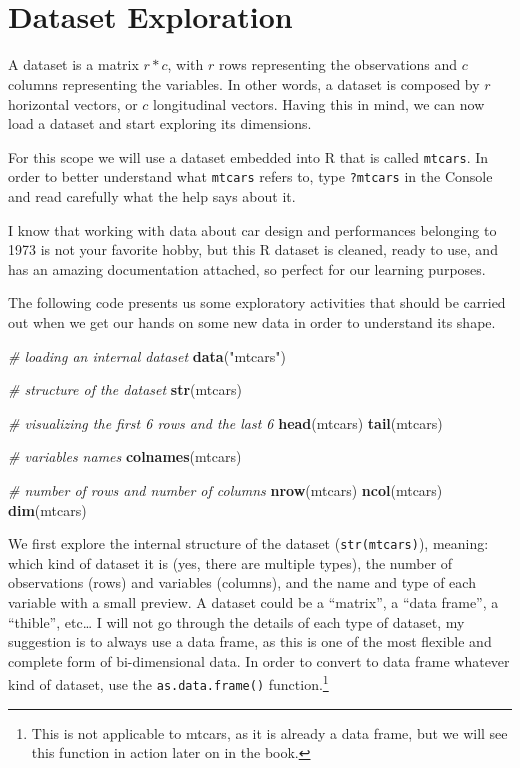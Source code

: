 \documentclass[
]{svmono}
\newenvironment{Shaded}{\begin{snugshade}}{\end{snugshade}}
\newcommand{\CommentTok}[1]{\textcolor[rgb]{0.56,0.35,0.01}{\textit{#1}}}
\newcommand{\FunctionTok}[1]{\textcolor[rgb]{0.13,0.29,0.53}{\textbf{#1}}}
\newcommand{\NormalTok}[1]{#1}
\newcommand{\StringTok}[1]{\textcolor[rgb]{0.31,0.60,0.02}{#1}}
\begin{document}
~

~
~

\hypertarget{dataset-exploration}{%
\section{Dataset Exploration}\label{dataset-exploration}}

A dataset is a matrix \(r*c\), with \(r\) rows representing the observations
and \(c\) columns representing the variables. In other words, a dataset is
composed by \(r\) horizontal vectors, or \(c\) longitudinal vectors. Having
this in mind, we can now load a dataset and start exploring its
dimensions.

For this scope we will use a dataset embedded into R that is called
\texttt{mtcars}. In order to better understand what \texttt{mtcars} refers to, type
\texttt{?mtcars} in the Console and read carefully what the help says about it.

I know that working with data about car design and performances
belonging to 1973 is not your favorite hobby, but this R dataset is
cleaned, ready to use, and has an amazing documentation attached, so
perfect for our learning purposes.

The following code presents us some exploratory activities that should
be carried out when we get our hands on some new data in order to
understand its shape.

\begin{Shaded}
\begin{Highlighting}[]
\CommentTok{\# loading an internal dataset}
\FunctionTok{data}\NormalTok{(}\StringTok{"mtcars"}\NormalTok{)}

\CommentTok{\# structure of the dataset}
\FunctionTok{str}\NormalTok{(mtcars)}

\CommentTok{\# visualizing the first 6 rows and the last 6}
\FunctionTok{head}\NormalTok{(mtcars)}
\FunctionTok{tail}\NormalTok{(mtcars)}

\CommentTok{\# variables names}
\FunctionTok{colnames}\NormalTok{(mtcars)}

\CommentTok{\# number of rows and number of columns}
\FunctionTok{nrow}\NormalTok{(mtcars)}
\FunctionTok{ncol}\NormalTok{(mtcars)}
\FunctionTok{dim}\NormalTok{(mtcars)}
\end{Highlighting}
\end{Shaded}

We first explore the internal structure of the dataset (\texttt{str(mtcars)}),
meaning: which kind of dataset it is (yes, there are multiple types),
the number of observations (rows) and variables (columns), and the name
and type of each variable with a small preview. A dataset could be a
``matrix'', a ``data frame'', a ``thible'', etc\ldots{} I will not go through the
details of each type of dataset, my suggestion is to always use a data
frame, as this is one of the most flexible and complete form of
bi-dimensional data. In order to convert to data frame whatever kind of
dataset, use the \texttt{as.data.frame()} function.\footnote{This is not applicable to mtcars, as it is already a data frame,
  but we will see this function in action later on in the book.}
\end{document}
